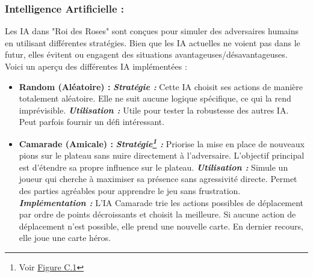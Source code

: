 \subsubsection*{Intelligence Artificielle :}
Les IA dans "Roi des Roses" sont conçues pour simuler des adversaires humains en utilisant différentes stratégies. Bien que les IA actuelles ne voient pas dans le futur, elles évitent ou engagent des situations avantageuses/désavantageuses. Voici un aperçu des différentes IA implémentées :\\

\begin{itemize}
	\item \textbf{Random (Aléatoire) :}
		\subitem \textbf{\emph{Stratégie :}} Cette IA choisit ses actions de manière totalement aléatoire. Elle ne suit aucune logique spécifique, ce qui la rend imprévisible.
		\subitem \textbf{\emph{Utilisation :}} Utile pour tester la robustesse des autres IA. Peut parfois fournir un défi intéressant.\\
    \item \textbf{Camarade (Amicale) :}
        \subitem \textbf{\emph{Stratégie\footnote{Voir \hyperref[fig:cam1]{Figure C.1}} :}} Priorise la mise en place de nouveaux pions sur le plateau sans nuire directement à l'adversaire. L'objectif principal est d'étendre sa propre influence sur le plateau.
		\subitem \textbf{\emph{Utilisation :}} Simule un joueur qui cherche à maximiser sa présence sans agressivité directe. Permet des parties agréables pour apprendre le jeu sans frustration.
		\subitem \textbf{\emph{Implémentation :}} L'IA Camarade trie les actions possibles de déplacement par ordre de points décroissants et choisit la meilleure. Si aucune action de déplacement n'est possible, elle prend une nouvelle carte. En dernier recours, elle joue une carte héros.\\
        

\end{itemize}
